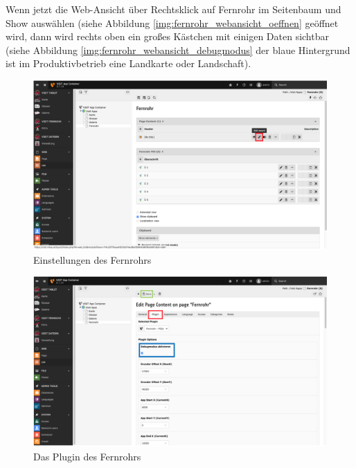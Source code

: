 Wenn jetzt die Web-Ansicht über Rechtsklick auf Fernrohr im Seitenbaum und \glqq Show\grqq{} auswählen (siehe Abbildung \ref{img:fernrohr_webansicht_oeffnen} geöffnet wird, dann wird rechts oben ein großes Kästchen mit einigen Daten sichtbar (siehe Abbildung \ref{img:fernrohr_webansicht_debugmodus} der blaue Hintergrund ist im Produktivbetrieb eine Landkarte oder Landschaft).


\begin{figure}[ht!]
\centering
\includegraphics[width=12cm]{Figures/paula/fernrohr/einrichtung_fernrohr/fernrohr_liste_uebersicht.png}
\caption{Einstellungen des Fernrohrs}
\label{img:fernrohr_einstellungen}
\end{figure}

\begin{figure}[ht!]
\centering
\includegraphics[width=12cm]{Figures/paula/fernrohr/einrichtung_fernrohr/fernrohr_plugin_einstellungen.png}
\caption{Das Plugin des Fernrohrs}
\label{img:fernrohr_plugin}
\end{figure}

